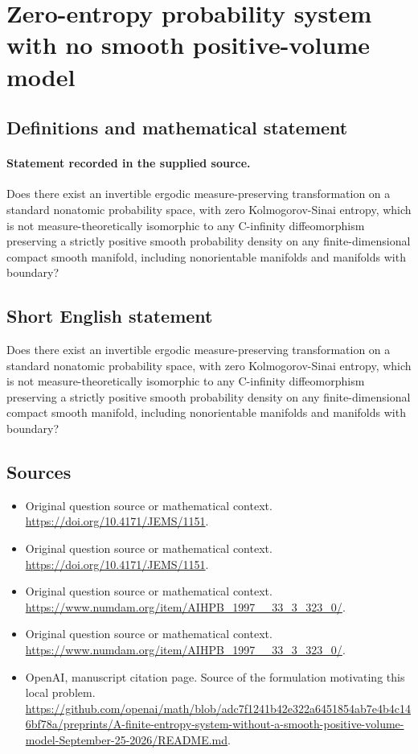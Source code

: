 \documentclass[11pt]{article}
\begin{document}
\section*{Zero-entropy probability system with no smooth positive-volume model}\label{30007175}
\subsection{Definitions and mathematical statement}
\paragraph{Statement recorded in the supplied source.}
Does there exist an invertible ergodic measure-preserving transformation on a standard nonatomic probability space, with zero Kolmogorov-Sinai entropy, which is not measure-theoretically isomorphic to any C-infinity diffeomorphism preserving a strictly positive smooth probability density on any finite-dimensional compact smooth manifold, including nonorientable manifolds and manifolds with boundary?
\subsection{Short English statement}
Does there exist an invertible ergodic measure-preserving transformation on a standard nonatomic probability space, with zero Kolmogorov-Sinai entropy, which is not measure-theoretically isomorphic to any C-infinity diffeomorphism preserving a strictly positive smooth probability density on any finite-dimensional compact smooth manifold, including nonorientable manifolds and manifolds with boundary?
\subsection{Sources}
\begin{itemize}
\item[S1] Original question source or mathematical context.
\url{https://doi.org/10.4171/JEMS/1151}.
\item[S2] Original question source or mathematical context.
\url{https://doi.org/10.4171/JEMS/1151}.
\item[S3] Original question source or mathematical context.
\url{https://www.numdam.org/item/AIHPB_1997__33_3_323_0/}.
\item[S4] Original question source or mathematical context.
\url{https://www.numdam.org/item/AIHPB_1997__33_3_323_0/}.
\item[S5] OpenAI, manuscript citation page. Source of the formulation motivating this local problem.
\url{https://github.com/openai/math/blob/adc7f1241b42e322a6451854ab7e4b4c146bf78a/preprints/A-finite-entropy-system-without-a-smooth-positive-volume-model-September-25-2026/README.md}.
\end{itemize}
\end{document}

